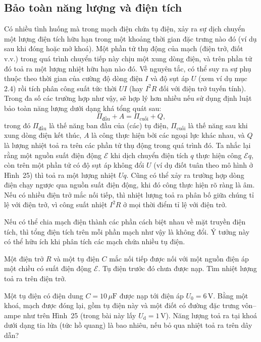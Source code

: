 \subsection{Bảo toàn năng lượng và điện tích}

Có nhiều tình huống mà trong mạch điện chứa tụ điện, xảy ra sự dịch chuyển một lượng điện tích hữu hạn trong một khoảng thời gian đặc trưng nào đó (ví dụ sau khi đóng hoặc mở khoá). Một phần tử thụ động của mạch (điện trở, điốt v.v.) trong quá trình chuyển tiếp này chịu một xung dòng điện, và trên phần tử đó toả ra một lượng nhiệt hữu hạn nào đó. Về nguyên tắc, có thể suy ra sự phụ thuộc theo thời gian của cường độ dòng điện $I$ và độ sụt áp $U$ (xem ví dụ mục 2.4) rồi tích phân công suất tức thời $UI$ (hay $I^2R$ đối với điện trở tuyến tính). Trong đa số các trường hợp như vậy, sẽ hợp lý hơn nhiều nếu sử dụng định luật bảo toàn năng lượng dưới dạng khá tổng quát sau:
\[
\Pi_{\text{đầu}} + A = \Pi_{\text{cuối}} + Q, \tag{2}
\]
trong đó $\Pi_{\text{đầu}}$ là thế năng ban đầu của (các) tụ điện, $\Pi_{\text{cuối}}$ là thế năng sau khi xung dòng điện kết thúc, $A$ là công thực hiện bởi các ngoại lực khác nhau, và $Q$ là lượng nhiệt toả ra trên các phần tử thụ động trong quá trình đó. Ta nhắc lại rằng một nguồn suất điện động $\mathcal{E}$ khi dịch chuyển điện tích $q$ thực hiện công $\mathcal{E}q$, còn trên một phần tử có độ sụt áp không đổi $U$ (ví dụ điốt tuân theo mô hình ở Hình~25) thì toả ra một lượng nhiệt $Uq$. Cũng có thể xảy ra trường hợp dòng điện chạy ngược qua nguồn suất điện động, khi đó công thực hiện rõ ràng là âm. Nếu có nhiều điện trở mắc nối tiếp, thì nhiệt lượng toả ra phân bố giữa chúng tỉ lệ với điện trở, vì công suất nhiệt $I^2R$ ở mọi thời điểm tỉ lệ với điện trở.

Nếu có thể chia mạch điện thành các phần cách biệt nhau về mặt truyền điện tích, thì tổng điện tích trên mỗi phần mạch như vậy là không đổi. Ý tưởng này có thể hữu ích khi phân tích các mạch chứa nhiều tụ điện.

 Một điện trở $R$ và một tụ điện $C$ mắc nối tiếp được nối với một nguồn điện áp một chiều có suất điện động $\mathcal{E}$. Tụ điện trước đó chưa được nạp. Tìm nhiệt lượng toả ra trên điện trở.


 Một tụ điện có điện dung $C=10\,\mu\mathrm{F}$ được nạp tới điện áp $U_0=6\,\mathrm{V}$. Bằng một khoá, mạch được đóng lại, gồm tụ điện này và một điốt có đường đặc trưng vôn--ampe như trên Hình~25 (trong bài này lấy $U_\mathrm{d}=1\,\mathrm{V}$). Năng lượng toả ra tại khoá dưới dạng tia lửa (tức hồ quang) là bao nhiêu, nếu bỏ qua nhiệt toả ra trên dây dẫn?

